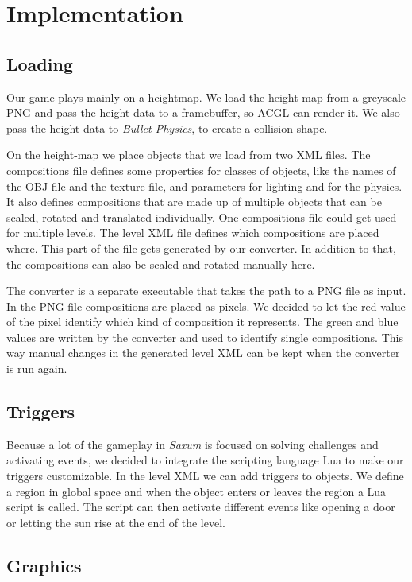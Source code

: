 \documentclass[sponsored]{acmsiggraph}
\begin{document}
\section{Implementation}

\subsection{Loading}

Our game plays mainly on a heightmap. We load the height-map from a greyscale PNG and pass the height data to a framebuffer, so ACGL can render it. We also pass the height data to \textit{Bullet Physics}, to create a collision shape.

On the height-map we place objects that we load from two XML files. The compositions file defines some properties for classes of objects, like the names of the OBJ file and the texture file, and parameters for lighting and for the physics. It also defines compositions that are made up of multiple objects that can be scaled, rotated and translated individually. One compositions file could get used for multiple levels. The level XML file defines which compositions are placed where. This part of the file gets generated by our converter. In addition to that, the compositions can also be scaled and rotated manually here.

The converter is a separate executable that takes the path to a PNG file as input. In the PNG file compositions are placed as pixels.
We decided to let the red value of the pixel identify which kind of composition it represents. The green and blue values are written by the converter and used to identify single compositions. This way manual changes in the generated level XML can be kept when the converter is run again.

\subsection{Triggers}

Because a lot of the gameplay in \textit{Saxum} is focused on solving challenges and activating events, we decided to integrate the scripting language Lua to make our triggers customizable. In the level XML we can add triggers to objects. We define a region in global space and when the object enters or leaves the region a Lua script is called. The script can then activate different events like opening a door or letting the sun rise at the end of the level.

\subsection{Graphics}
\end{document}
